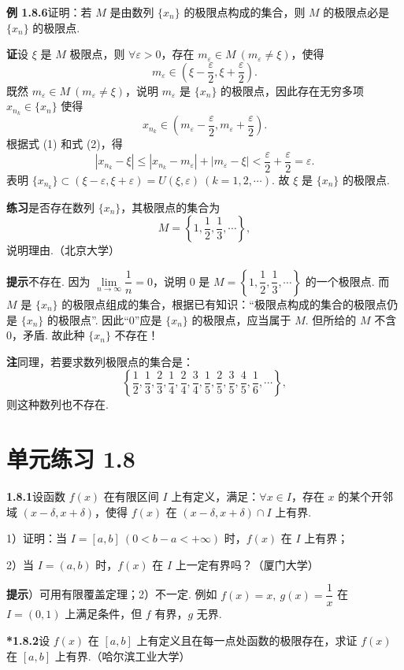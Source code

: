 \documentclass[UTF8, 12pt, fontset=fandol, oneside]{ctexart}
\begin{document}
\noindent\textbf{例 1.8.6}\quad 证明：若 $M$ 是由数列 $\{x_n\}$ 的极限点构成的集合，则 $M$ 的极限点必是 $\{x_n\}$ 的极限点.

\noindent\textbf{证}\quad 设 $\xi$ 是 $M$ 极限点，则 $\forall \varepsilon>0$，存在 $m_\varepsilon\in M\ (m_\varepsilon\ne\xi)$，使得
\[
  m_\varepsilon\in\left(\xi-\frac\varepsilon2,\xi+\frac\varepsilon2\right).
\tag{1}
\]
既然 $m_\varepsilon\in M\ (m_\varepsilon\ne\xi)$，说明 $m_\varepsilon$ 是 $\{x_n\}$ 的极限点，因此存在无穷多项 $x_{n_k}\in\{x_n\}$ 使得
\[
  x_{n_k}\in\left(m_\varepsilon-\frac\varepsilon2,m_\varepsilon+\frac\varepsilon2\right).
\tag{2}
\]
根据式 (1) 和式 (2)，得
\[
  |x_{n_k}-\xi|\le |x_{n_k}-m_\varepsilon|+|m_\varepsilon-\xi|<\frac\varepsilon2+\frac\varepsilon2=\varepsilon.
\]
表明 $\{x_{n_k}\}\subset(\xi-\varepsilon,\xi+\varepsilon)=U(\xi,\varepsilon)\ (k=1,2,\cdots)$. 故 $\xi$ 是 $\{x_n\}$ 的极限点.

\noindent\textbf{练习}\quad 是否存在数列 $\{x_n\}$，其极限点的集合为
\[
  M=\left\{1,\frac12,\frac13,\cdots\right\},
\]
说明理由.（北京大学）

\noindent\textbf{提示}\quad 不存在. 因为 $\lim\limits_{n\to\infty}\dfrac1n=0$，说明 0 是 $M=\left\{1,\dfrac12,\dfrac13,\cdots\right\}$ 的一个极限点. 而 $M$ 是 $\{x_n\}$ 的极限点组成的集合，根据已有知识：“极限点构成的集合的极限点仍是 $\{x_n\}$ 的极限点”. 因此“0”应是 $\{x_n\}$ 的极限点，应当属于 $M$. 但所给的 $M$ 不含 0，矛盾. 故此种 $\{x_n\}$ 不存在！

\noindent\textbf{注}\quad 同理，若要求数列极限点的集合是：
\[
  \left\{\frac12,\frac13,\frac23,\frac14,\frac24,\frac34,\frac15,\frac25,\frac35,\frac45,\frac16,\cdots\right\},
\]
则这种数列也不存在.

\section*{单元练习 1.8}

\noindent\textbf{1.8.1}\quad 设函数 $f(x)$ 在有限区间 $I$ 上有定义，满足：$\forall x\in I$，存在 $x$ 的某个开邻域 $(x-\delta,x+\delta)$，使得 $f(x)$ 在 $(x-\delta,x+\delta)\cap I$ 上有界.

1）证明：当 $I=[a,b]\ (0<b-a<+\infty)$ 时，$f(x)$ 在 $I$ 上有界；

2）当 $I=(a,b)$ 时，$f(x)$ 在 $I$ 上一定有界吗？（厦门大学）

\noindent\textbf{提示}）可用有限覆盖定理；2）不一定. 例如 $f(x)=x,\ g(x)=\dfrac1x$ 在 $I=(0,1)$ 上满足条件，但 $f$ 有界，$g$ 无界.

\noindent\textbf{*1.8.2}\quad 设 $f(x)$ 在 $[a,b]$ 上有定义且在每一点处函数的极限存在，求证 $f(x)$ 在 $[a,b]$ 上有界.（哈尔滨工业大学）
\end{document}
